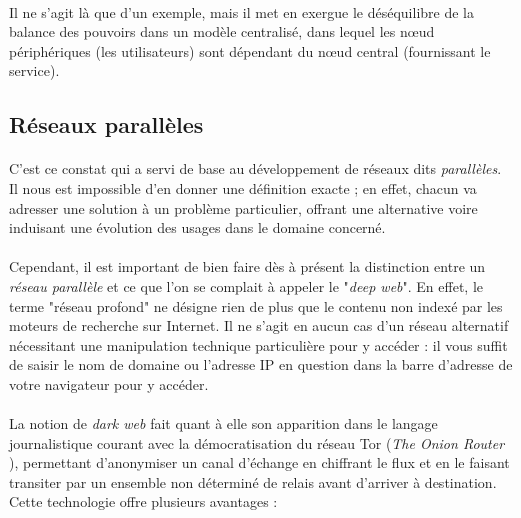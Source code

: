 \paragraph{} Il ne s'agit là que d'un exemple, mais il met en exergue le déséquilibre de la balance des pouvoirs dans un 
modèle centralisé, dans lequel les n\oe{}ud périphériques (les utilisateurs) sont dépendant du n\oe{}ud central (fournissant
le service).


\subsection*{Réseaux parallèles}

\paragraph{} C'est ce constat qui a servi de base au développement de réseaux dits \emph{parallèles}. Il nous est
impossible d'en donner une définition exacte ; en effet, chacun va adresser une solution à un problème particulier,
offrant une alternative voire induisant une évolution des usages dans le domaine concerné.

\paragraph{} Cependant, il est important de bien faire dès à présent la distinction entre un \emph{réseau parallèle} et 
ce que l'on se complait à appeler le "\emph{deep web}". En effet, le terme "réseau profond" ne
désigne rien de plus que le contenu non indexé par les moteurs de recherche sur Internet. Il ne s'agit en aucun cas d'un
réseau alternatif nécessitant une manipulation technique particulière pour y accéder : il vous suffit de saisir le nom de
domaine ou l'adresse IP en question dans la barre d'adresse de votre navigateur pour y accéder.

\paragraph{} La notion de \emph{dark web} fait quant à elle son apparition dans le langage journalistique courant avec la 
démocratisation du réseau Tor (\emph{The Onion Router} \cite{Internet4}), permettant d'anonymiser un canal d'échange en chiffrant
le flux et en le faisant transiter par un ensemble non déterminé de relais avant d'arriver à destination. Cette technologie
offre plusieurs avantages : 

